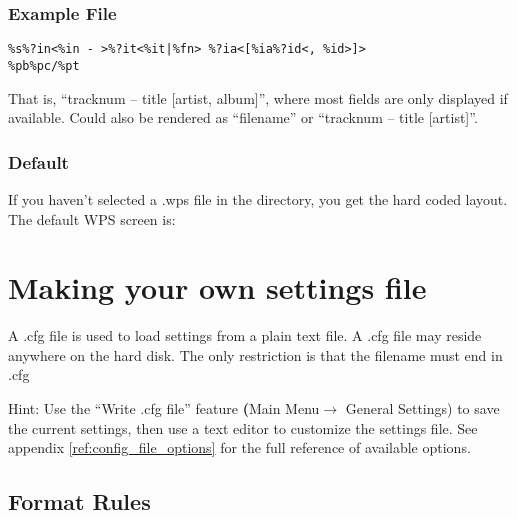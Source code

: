 \subsubsection{Example File}
\begin{verbatim}
%s%?in<%in - >%?it<%it|%fn> %?ia<[%ia%?id<, %id>]>
%pb%pc/%pt
\end{verbatim}
That is, ``tracknum -- title [artist, album]'', where most fields are only
displayed if available. Could also be rendered as ``filename'' or ``tracknum --
title [artist]''.

\subsubsection{Default}
If you haven't selected a .wps file in the  directory, you get
the hard coded layout. The default WPS screen is:


\section{\label{ref:SettingsFile}Making your own settings file}
A .cfg file is used to load settings from a plain text file. A .cfg file may
reside anywhere on the hard disk. The only restriction is that the filename
must end in .cfg

Hint: Use the ``Write .cfg file'' feature \textbf({Main Menu$\rightarrow$
General Settings}) to save the current settings, then use a text editor to
customize the settings file. See appendix \ref{ref:config_file_options} 
for the full reference of available options.

\subsection{Format Rules}

